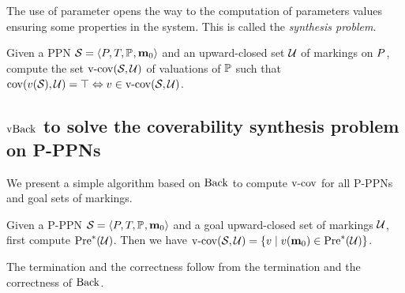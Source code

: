 
The use of parameter opens the way to the computation of parameters values ensuring some properties in the system.
This is called the \emph{synthesis problem}.

\begin{defi}
  \label{defi:cov-synth-prblm}
  Given a \ac{PPN} $\defPPN$ and an upward-closed set $\mathcal{U}$ of markings on $P$,
  compute the set $\operatorname{v-cov}(\mathcal{S}_{{}},\mathcal{U})$ of valuations of $\mathbb{P}$
  such that
  $\cov{\val[\namePPN]}{\ucs} = \top \Leftrightarrow \val \in \vcov{\namePPN}{\ucs}$.
\end{defi}

\subsection{$\operatorname{vBack}$ to solve the coverability synthesis problem on P-PPNs}

We present a simple algorithm based on $\operatorname{Back}$ to compute $\operatorname{v-cov}$ for all P-PPNs \namePPN and goal sets of markings.

Given a P-PPN $\defPPN$ and a goal upward-closed set of markings $\mathcal{U}$,
first compute $\operatorname{Pre}^*_{}(\mathcal{U})$.
Then we have
\(
  \vcov{\namePPN}{\ucs} =
  \setComp{\val}{
    \val[\mar_0] \in \pres{\ucs}
  }
\).

The termination and the correctness follow from the termination and the correctness of $\operatorname{Back}$.

%
%
%


